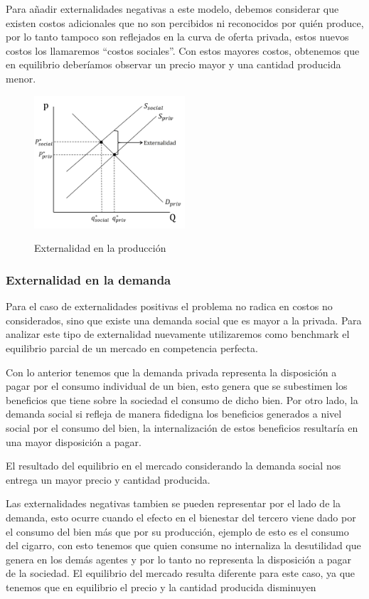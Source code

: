 Para añadir externalidades negativas a este modelo, debemos considerar que existen costos adicionales que no son percibidos ni reconocidos por quién produce, por lo tanto tampoco son reflejados en la curva de oferta privada, estos nuevos costos los llamaremos ``costos sociales''. Con estos mayores costos, obtenemos que en equilibrio deberíamos observar un precio mayor y una cantidad producida menor.

\begin{figure}[htbp]
    \centering
    \caption{Externalidad en la producción}
    \includegraphics[width=0.5\textwidth]{Figuras/Externalidad Produccion.jpg}
    \label{fig:Ext. Producción}
\end{figure}

\subsubsection{Externalidad en la demanda}

Para el caso de externalidades positivas el problema no radica en costos no considerados, sino que existe una demanda social que es mayor a la privada. Para analizar este tipo de externalidad nuevamente utilizaremos como benchmark el equilibrio parcial de un mercado en competencia perfecta.

Con lo anterior tenemos que la demanda privada representa la disposición a pagar por el consumo individual de un bien, esto genera que se subestimen los beneficios que tiene sobre la sociedad el consumo de dicho bien. Por otro lado, la demanda social si refleja de manera fidedigna los beneficios generados a nivel social por el consumo del bien, la internalización de estos beneficios resultaría en una mayor disposición a pagar.

El resultado del equilibrio en el mercado considerando la demanda social nos entrega un mayor precio y cantidad producida.

Las externalidades negativas tambien se pueden representar por el lado de la demanda, esto ocurre cuando el efecto en el bienestar del tercero viene dado por el consumo del bien más que por su producción, ejemplo de esto es el consumo del cigarro, con esto tenemos que quien consume no internaliza la desutilidad que genera en los demás agentes y por lo tanto no representa la disposición a pagar de la sociedad. El equilibrio del mercado resulta diferente para este caso, ya que tenemos que en equilibrio el precio y la cantidad producida disminuyen

